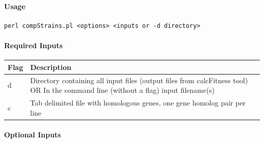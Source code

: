 \documentclass[11pt,]{article}
\let\oldparagraph\paragraph
\renewcommand{\paragraph}[1]{\oldparagraph{#1}\mbox{}}
\begin{document}
\paragraph{Usage}\label{usage-4}

\begin{verbatim}
perl compStrains.pl <options> <inputs or -d directory>
\end{verbatim}

\paragraph{Required Inputs}\label{required-inputs-4}

\begin{longtable}[]{@{}ll@{}}
\toprule
\begin{minipage}[b]{0.05\columnwidth}\raggedright\strut
Flag\strut
\end{minipage} & \begin{minipage}[b]{0.89\columnwidth}\raggedright\strut
Description\strut
\end{minipage}\tabularnewline
\midrule
\endhead
\begin{minipage}[t]{0.05\columnwidth}\raggedright\strut
d\strut
\end{minipage} & \begin{minipage}[t]{0.89\columnwidth}\raggedright\strut
Directory containing all input files (output files from calcFitness
tool) OR In the command line (without a flag) input filename(s)\strut
\end{minipage}\tabularnewline
\begin{minipage}[t]{0.05\columnwidth}\raggedright\strut
c\strut
\end{minipage} & \begin{minipage}[t]{0.89\columnwidth}\raggedright\strut
Tab delimited file with homologous genes, one gene homolog pair per
line\strut
\end{minipage}\tabularnewline
\bottomrule
\end{longtable}

\paragraph{Optional Inputs}\label{optional-inputs-4}
\end{document}
